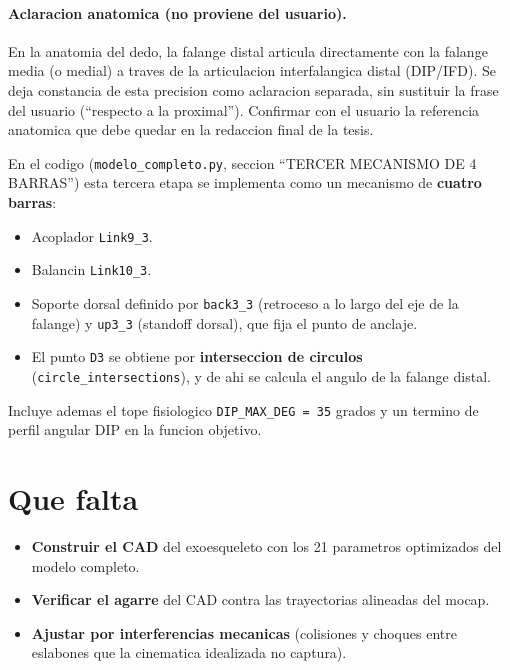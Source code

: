 \documentclass[11pt,a4paper]{article}
\begin{document}
\paragraph{Aclaracion anatomica (no proviene del usuario).} En la anatomia del
dedo, la falange distal articula directamente con la falange media (o medial) a
traves de la articulacion interfalangica distal (DIP/IFD). Se deja constancia de
esta precision como aclaracion separada, sin sustituir la frase del usuario
(``respecto a la proximal''). Confirmar con el usuario la referencia anatomica que
debe quedar en la redaccion final de la tesis.

En el codigo (\texttt{modelo\_completo.py}, seccion ``TERCER MECANISMO DE 4
BARRAS'') esta tercera etapa se implementa como un mecanismo de \textbf{cuatro
barras}:

\begin{itemize}[leftmargin=1.4em]
  \item Acoplador \texttt{Link9\_3}.
  \item Balancin \texttt{Link10\_3}.
  \item Soporte dorsal definido por \texttt{back3\_3} (retroceso a lo largo del
        eje de la falange) y \texttt{up3\_3} (standoff dorsal), que fija el punto
        de anclaje.
  \item El punto \texttt{D3} se obtiene por \textbf{interseccion de circulos}
        (\texttt{circle\_intersections}), y de ahi se calcula el angulo de la
        falange distal.
\end{itemize}

Incluye ademas el tope fisiologico \texttt{DIP\_MAX\_DEG = 35} grados y un termino
de perfil angular DIP en la funcion objetivo.

\section{Que falta}

\begin{itemize}[leftmargin=1.4em]
  \item \textbf{Construir el CAD} del exoesqueleto con los 21 parametros
        optimizados del modelo completo.
  \item \textbf{Verificar el agarre} del CAD contra las trayectorias alineadas
        del mocap.
  \item \textbf{Ajustar por interferencias mecanicas} (colisiones y choques entre
        eslabones que la cinematica idealizada no captura).
\end{itemize}
\end{document}

